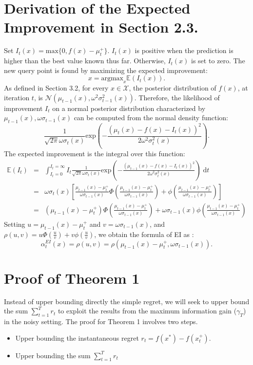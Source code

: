 \documentclass[twoside]{article}
\begin{document}
\section{Derivation of the Expected Improvement in Section 2.3.}
Set $I_t(x) = \text{max}\{0, f(x) - \mu^+_t\}$. $I_t(x)$ is positive when the prediction is higher than the best value known
thus far. Otherwise, $I_t(x)$ is set to zero. The new query point is found by
maximizing the expected improvement:
$$x = \text{argmax}_{x} \mathbb{E}(I_t(x)).$$
As defined in Section 3.2, for every $x \in \mathcal X$, the posterior distribution of $f(x)$, at iteration $t$, is $\mathcal N(\mu_{t-1}(x), \omega^2\sigma^2_{t-1}(x))$. Therefore, the likelihood of improvement $I_t$ on a normal posterior distribution characterized
by $\mu_{t-1}(x), \omega\sigma_{t-1}(x)$ can be computed from the normal density function:
$$\frac{1}{\sqrt{2\pi}\omega\sigma_t(x)}\text{exp}(-\frac{(\mu_t(x) - f(x)- I_t(x))^2}{2\omega^2\sigma^2_t(x)}).$$
The expected improvement is the integral over this function:
\begin{eqnarray*}
\mathbb{E}(I_t) & = & \int_{I_t = 0}^{I_t = \infty} I_t\frac{1}{\sqrt{2\pi}\omega\sigma_t(x)}\text{exp}(-\frac{(\mu_{t-1}(x) - f(x)- I_t(x))^2}{2\omega^2\sigma^2_t(x)})\;\mathrm{d}t \\
& = & \omega\sigma_t(x)[\frac{\mu_{t-1}(x) - \mu^+_t}{\omega\sigma_{t-1}(x)} \Phi(\frac{\mu_{t-1}(x) - \mu^+_t}{\omega\sigma_{t-1}(x)}) + \phi(\frac{\mu_{t-1}(x) - \mu^+_t}{\omega\sigma_{t-1}(x)})] \\
& = & (\mu_{t-1}(x) - \mu^+_t)\Phi(\frac{\mu_{t-1}(x) - \mu^+_t}{\omega\sigma_{t-1}(x)}) + \omega\sigma_{t-1}(x)\phi(\frac{\mu_{t-1}(x) - \mu^+_t}{\omega\sigma_{t-1}(x)})
\end{eqnarray*}
Setting $u = \mu_{t-1}(x) - \mu^+_t$ and $v = \omega\sigma_{t-1}(x)$, and $\rho(u, v) = u\Phi(\frac{u}{v}) + v\phi(\frac{u}{v})$, we obtain the formula of EI as : $$\alpha_t^{EI}(x) = \rho(u,v) = \rho(\mu_{t-1}(x) - \mu^+_t,\omega\sigma_{t-1}(x)).$$
\section{Proof of Theorem 1}
Instead of upper bounding directly the simple regret, we will seek to upper bound the sum $\sum_{t=1}^{T} r_t$ to exploit the results from the maximum information gain ($\gamma_T$) in the noisy setting. The proof for Theorem 1 involves two steps.
\begin{itemize}
  \item Upper bounding the instantaneous regret $r_t = f(x^*) - f(x_t^+)$.
  \item Upper bounding the sum $\sum_{t=1}^{T} r_t$
\end{itemize}
\end{document}
